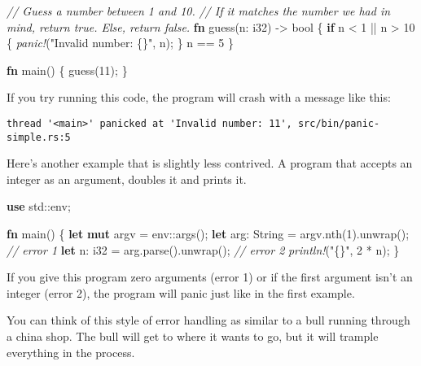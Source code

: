 \documentclass[a4paper,]{book}
\newenvironment{Shaded}{\begin{snugshade}}{\end{snugshade}}
\newcommand{\KeywordTok}[1]{\textcolor[rgb]{0.13,0.29,0.53}{\textbf{{#1}}}}
\newcommand{\DataTypeTok}[1]{\textcolor[rgb]{0.13,0.29,0.53}{{#1}}}
\newcommand{\DecValTok}[1]{\textcolor[rgb]{0.00,0.00,0.81}{{#1}}}
\newcommand{\StringTok}[1]{\textcolor[rgb]{0.31,0.60,0.02}{{#1}}}
\newcommand{\CommentTok}[1]{\textcolor[rgb]{0.56,0.35,0.01}{\textit{{#1}}}}
\newcommand{\PreprocessorTok}[1]{\textcolor[rgb]{0.56,0.35,0.01}{\textit{{#1}}}}
\newcommand{\NormalTok}[1]{{#1}}
\begin{document}
\begin{Shaded}
\begin{Highlighting}[]
\CommentTok{// Guess a number between 1 and 10.}
\CommentTok{// If it matches the number we had in mind, return true. Else, return false.}
\KeywordTok{fn} \NormalTok{guess(n: }\DataTypeTok{i32}\NormalTok{) -> }\DataTypeTok{bool} \NormalTok{\{}
    \KeywordTok{if} \NormalTok{n < }\DecValTok{1} \NormalTok{|| n > }\DecValTok{10} \NormalTok{\{}
        \PreprocessorTok{panic!}\NormalTok{(}\StringTok{"Invalid number: \{\}"}\NormalTok{, n);}
    \NormalTok{\}}
    \NormalTok{n == }\DecValTok{5}
\NormalTok{\}}

\KeywordTok{fn} \NormalTok{main() \{}
    \NormalTok{guess(}\DecValTok{11}\NormalTok{);}
\NormalTok{\}}
\end{Highlighting}
\end{Shaded}

If you try running this code, the program will crash with a message like
this:

\begin{verbatim}
thread '<main>' panicked at 'Invalid number: 11', src/bin/panic-simple.rs:5
\end{verbatim}

Here's another example that is slightly less contrived. A program that
accepts an integer as an argument, doubles it and prints it.


\begin{Shaded}
\begin{Highlighting}[]
\KeywordTok{use} \NormalTok{std::env;}

\KeywordTok{fn} \NormalTok{main() \{}
    \KeywordTok{let} \KeywordTok{mut} \NormalTok{argv = env::args();}
    \KeywordTok{let} \NormalTok{arg: }\DataTypeTok{String} \NormalTok{= argv.nth(}\DecValTok{1}\NormalTok{).unwrap(); }\CommentTok{// error 1}
    \KeywordTok{let} \NormalTok{n: }\DataTypeTok{i32} \NormalTok{= arg.parse().unwrap(); }\CommentTok{// error 2}
    \PreprocessorTok{println!}\NormalTok{(}\StringTok{"\{\}"}\NormalTok{, }\DecValTok{2} \NormalTok{* n);}
\NormalTok{\}}
\end{Highlighting}
\end{Shaded}

If you give this program zero arguments (error 1) or if the first
argument isn't an integer (error 2), the program will panic just like in
the first example.

You can think of this style of error handling as similar to a bull
running through a china shop. The bull will get to where it wants to go,
but it will trample everything in the process.
\end{document}
